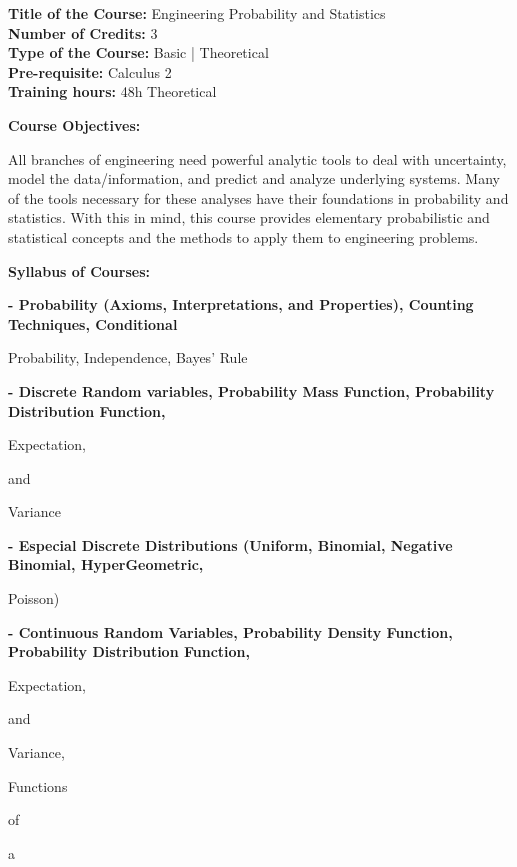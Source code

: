 \documentclass[12pt,a4paper]{article}
\begin{document}
\newpage
\textbf{Title of the Course:} Engineering Probability and Statistics\\
\textbf{Number of Credits:} 3\\
\textbf{Type of the Course:} Basic | Theoretical\\
\textbf{Pre-requisite:} Calculus 2\\
\textbf{Training hours:} 48h Theoretical\par\vspace{4pt}
\textbf{Course Objectives:}\par\vspace{2pt}
All branches of engineering need powerful analytic tools to deal with uncertainty, model the
data/information, and predict and analyze underlying systems. Many of the tools necessary for
these analyses have their foundations in probability and statistics. With this in mind, this course
provides elementary probabilistic and statistical concepts and the methods to apply them to
engineering problems.\par\vspace{4pt}
\textbf{Syllabus of Courses:}\par\vspace{2pt}
\vspace{2pt}\textbf{- Probability (Axioms, Interpretations, and Properties), Counting Techniques, Conditional}\par
Probability, Independence, Bayes’ Rule\par
\vspace{2pt}\textbf{- Discrete Random variables, Probability Mass Function, Probability Distribution Function,}\par
Expectation,\par
and\par
Variance\par
\vspace{2pt}\textbf{- Especial Discrete Distributions (Uniform, Binomial, Negative Binomial, HyperGeometric,}\par
Poisson)\par
\vspace{2pt}\textbf{- Continuous Random Variables, Probability Density Function, Probability Distribution Function,}\par
Expectation,\par
and\par
Variance,\par
Functions\par
of\par
a\par
\end{document}
